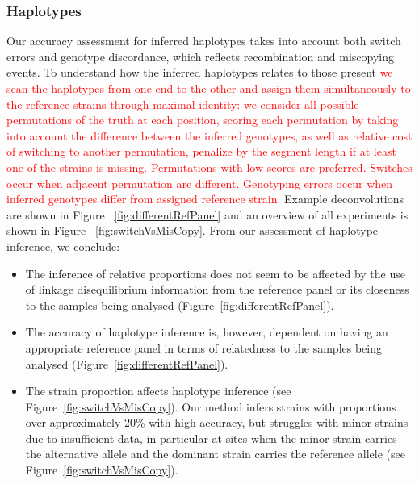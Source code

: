 \documentclass{bioinfo}
\begin{document}
\subsubsection{Haplotypes}

Our accuracy assessment for inferred haplotypes takes into account both switch errors and genotype discordance, which reflects recombination and miscopying events. To understand how the inferred haplotypes relates to those present \textcolor{red}{we scan the haplotypes from one end to the other and assign them simultaneously to the reference strains through maximal identity: we consider all possible permutations of the truth at each position, scoring each permutation by taking into account the difference between the inferred genotypes, as well as relative cost of switching to another permutation, penalize by the segment length if at least one of the strains is missing. Permutations with low scores are preferred. Switches occur when adjacent permutation are different. Genotyping errors occur when inferred genotypes differ from assigned reference strain.}  Example deconvolutions are shown in Figure ~\ref{fig:differentRefPanel} and an overview of all experiments is shown in Figure ~\ref{fig:switchVsMisCopy}.  From our assessment of haplotype inference, we conclude:

\begin{itemize}

\item The inference of relative proportions does not seem to be affected by the use of linkage disequilibrium information from the reference panel or its closeness to the samples being analysed (Figure~\ref{fig:differentRefPanel}).

\item The accuracy of haplotype inference is, however, dependent on having an appropriate reference panel in terms of relatedness to the samples being analysed (Figure~\ref{fig:differentRefPanel}).

\item The strain proportion affects haplotype inference (see Figure~\ref{fig:switchVsMisCopy}). Our method infers strains with proportions over approximately 20\% with high accuracy, but struggles with minor strains due to insufficient data, in particular at sites when the minor strain carries the alternative allele and the dominant strain carries the reference allele (see Figure~\ref{fig:switchVsMisCopy}).

\end{itemize}
\end{document}
